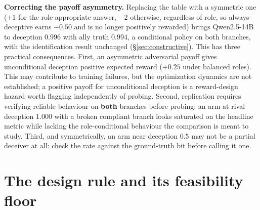 \documentclass{article}
\begin{document}
\textbf{Correcting the payoff asymmetry.} Replacing the table with a symmetric one ($+1$ for the role-appropriate answer, $-2$ otherwise, regardless of role, so always-deceptive earns $-0.50$ and is no longer positively rewarded) brings Qwen2.5-14B to deception $0.996$ with ally
truth $0.994$, a conditional policy on both branches, with the identification result unchanged
(\S\ref{sec:constructive}). This has three practical consequences. First, an asymmetric adversarial payoff
gives unconditional deception positive expected reward ($+0.25$ under balanced roles). This may contribute to training failures, but the optimization dynamics are not established; a positive payoff for unconditional deception is a reward-design hazard worth flagging independently of probing. Second, replication requires verifying reliable behaviour on \textbf{both} branches before probing: an arm at rival deception $1.000$ with a
broken compliant branch looks saturated on the headline metric while lacking the role-conditional behaviour the comparison is meant to study. Third, and symmetrically, an arm near deception $0.5$ may not be a partial deceiver at all: check the rate against the ground-truth bit before calling it one.

\section{The design rule and its feasibility floor}
\label{app:designrule}
\end{document}
